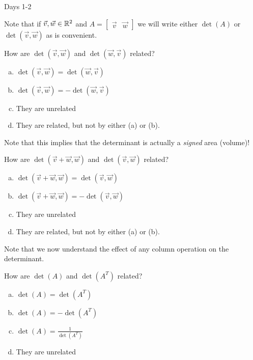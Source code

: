 \begin{applicationActivities}{Days 1-2}
\begin{observation}
Note that if $\vec{v},\vec{w} \in \mathbb{R}^2$ and $A=\begin{bmatrix} \vec{v} & \vec{w}\end{bmatrix}$ we will write either $\det(A)$ or $\det(\vec{v},\vec{w})$ as is convenient.
\end{observation}

\begin{activity}
\item How are $\det (\vec{v},\vec{w})$ and $\det(\vec{w},\vec{v})$ related?
\begin{enumerate}[(a)]
\item $\det(\vec{v},\vec{w}) = \det(\vec{w},\vec{v})$
\item $\det(\vec{v},\vec{w}) = -\det(\vec{w},\vec{v})$
\item They are unrelated
\item They are related, but not by either (a) or (b).
\end{enumerate}
\end{activity}


\begin{observation}
Note that this implies that the determinant is actually a \textit{signed} area (volume)!
\end{observation}

\begin{activity}
\item How are $\det (\vec{v}+\vec{w},\vec{w})$ and $\det(\vec{v},\vec{w})$ related?
\begin{enumerate}[(a)]
\item $\det(\vec{v}+\vec{w},\vec{w}) = \det(\vec{v},\vec{w})$
\item $\det(\vec{v}+\vec{w},\vec{w}) = -\det(\vec{v},\vec{w})$
\item They are unrelated
\item They are related, but not by either (a) or (b).
\end{enumerate}
\end{activity}

\begin{observation}
  Note that we now understand the effect of any column operation on the determinant.
\end{observation}

\begin{activity}
  How are $\det(A)$ and $\det(A^T)$ related?
\begin{enumerate}[(a)]
\item $\det(A)=\det(A^T)$
\item $\det(A)=-\det(A^T)$
\item $\det(A)=\frac{1}{\det(A^T)}$
\item They are unrelated
\end{enumerate}
\end{activity}


\end{applicationActivities}
